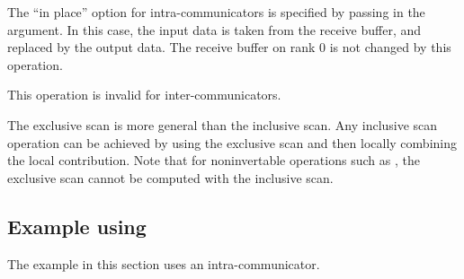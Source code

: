 The ``in place'' option for intra-communicators is specified by passing  in the  argument.
In this case, the input data is taken from the receive buffer, and replaced by the output data.
The receive buffer on rank 0 is not changed by this operation.

This operation is invalid for inter-communicators.%

\begin{rationale}
The exclusive scan is more general than the inclusive scan.
Any inclusive scan operation can be
achieved by using the exclusive scan and then locally combining the
local contribution.  Note that for noninvertable operations such as
, the exclusive scan cannot be computed with the
inclusive scan.
\end{rationale}

\subsection{Example using \texorpdfstring{}{MPI\_SCAN}}
\label{coll-scan-example}

The example in this section uses an intra-communicator.

